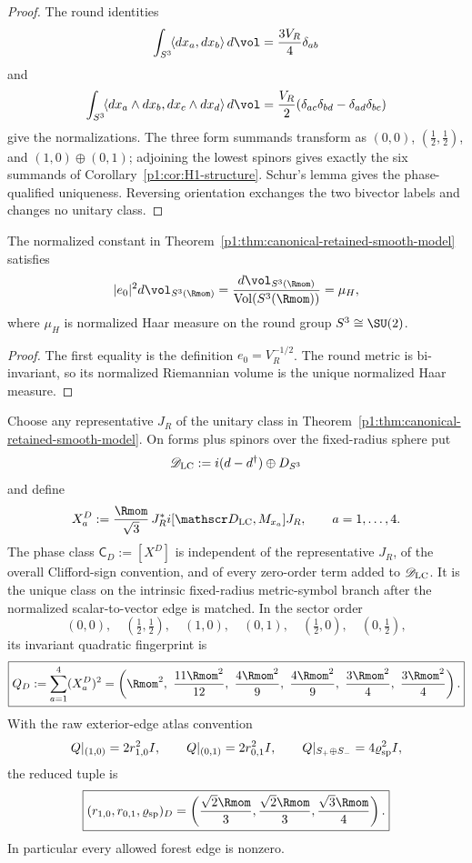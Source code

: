 \documentclass[11pt]{article}
\begin{document}
\begin{proof}
The round identities
\[
 \int_{S^3}\!\langle dx_a,dx_b\rangle\,d\vol
 =\frac{3V_R}{4}\delta_{ab}
\]
and
\[
 \int_{S^3}\!\langle dx_a\wedge dx_b,dx_c\wedge dx_d\rangle\,d\vol
 =\frac{V_R}{2}
  (\delta_{ac}\delta_{bd}-\delta_{ad}\delta_{bc})
\]
give the normalizations.  The three form summands transform as
\((0,0)\), \((\tfrac12,\tfrac12)\), and
\((1,0)\oplus(0,1)\); adjoining the lowest spinors gives exactly the six
summands of Corollary~\ref{p1:cor:H1-structure}.  Schur's lemma gives the
phase-qualified uniqueness.  Reversing orientation exchanges the two
bivector labels and changes no unitary class.
\end{proof}

\begin{corollary}
\label{p1:cor:normalized-constant-haar-density}
The normalized constant in
Theorem~\ref{p1:thm:canonical-retained-smooth-model} satisfies
\[
 |e_0|^2d\vol_{S^3(\Rmom)}
 =\frac{d\vol_{S^3(\Rmom)}}{\operatorname{Vol}(S^3(\Rmom))}
 =\mu_H,
\]
where \(\mu_H\) is normalized Haar measure on the round group
\(S^3\cong\SU(2)\).
\end{corollary}

\begin{proof}
The first equality is the definition \(e_0=V_R^{-1/2}\).  The round metric
is bi-invariant, so its normalized Riemannian volume is the unique normalized
Haar measure.
\end{proof}

\begin{theorem}
\label{p1:thm:intrinsic-tangential-coordinate-class}
Choose any representative \(J_R\) of the unitary class in
Theorem~\ref{p1:thm:canonical-retained-smooth-model}.  On forms plus spinors
over the fixed-radius sphere put
\[
 \mathscr D_{\rm LC}:=i(d-d^\dagger)\oplus D_{S^3}
\]
and define
\[
 X_a^D:=\frac{\Rmom}{\sqrt3}\,
 J_R^*i[\mathscr D_{\rm LC},M_{x_a}]J_R,
 \qquad a=1,\ldots,4.
\]
The phase class \(\mathsf C_D:=[X^D]\) is independent of the representative
\(J_R\), of the overall Clifford-sign convention, and of every zero-order
term added to \(\mathscr D_{\rm LC}\).  It is the unique class on the
intrinsic fixed-radius metric-symbol branch after the normalized
scalar-to-vector edge is matched.  In the sector order
\[
 (0,0),\quad(\tfrac12,\tfrac12),\quad(1,0),\quad(0,1),
 \quad(\tfrac12,0),\quad(0,\tfrac12),
\]
its invariant quadratic fingerprint is
\[
 \boxed{
 Q_D:=\sum_{a=1}^4(X_a^D)^2
 =\left(
 \Rmom^2,\ \frac{11\Rmom^2}{12},\
 \frac{4\Rmom^2}{9},\ \frac{4\Rmom^2}{9},\
 \frac{3\Rmom^2}{4},\ \frac{3\Rmom^2}{4}
 \right).}
\]
With the raw exterior-edge atlas convention
\[
 Q|_{(1,0)}=2r_{1,0}^2I,\qquad
 Q|_{(0,1)}=2r_{0,1}^2I,\qquad
 Q|_{S_+\oplus S_-}=4\varrho_{\rm sp}^2I,
\]
the reduced tuple is
\[
 \boxed{
 (r_{1,0},r_{0,1},\varrho_{\rm sp})_D
 =\left(\frac{\sqrt2\Rmom}{3},
        \frac{\sqrt2\Rmom}{3},
        \frac{\sqrt3\Rmom}{4}\right).}
\]
In particular every allowed forest edge is nonzero.
\end{theorem}
\end{document}
